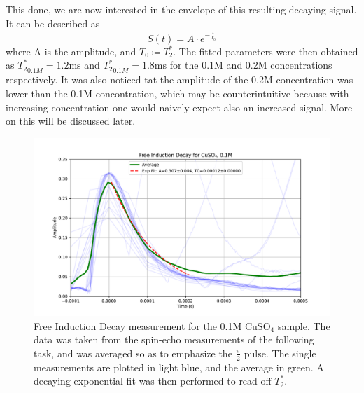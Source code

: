 \documentclass[12pt]{article}
\begin{document}
This done, we are now interested in the envelope of this resulting decaying signal. It can be described as  \[
	S(t) = A \cdot e^{-\frac{t}{T_0}}
\]
where A is the amplitude, and $T_0 \coloneq T_2^*$. The fitted parameters were then obtained as ${T_2^*}_{0.1M} = 1.2 \text{ms}$ and ${T_2^*}_{0.1M} = 1.8 \text{ms}$ for the 0.1M and 0.2M concentrations respectively. It was also noticed tat the amplitude of the 0.2M concentration was lower than the 0.1M concontration, which may be counterintuitive because with increasing concentration one would naively expect also an increased signal. More on this will be discussed later.

\begin{figure}[H]
  \includegraphics[scale = 0.5]{Free_Induction_Decay_0.1M.pdf}
  \caption{Free Induction Decay measurement for the 0.1M $\text{CuSO}_4$ sample. The data was taken from the spin-echo measurements of the following task, and was averaged so as to emphasize the $\frac{\pi}{2}$ pulse. The single measurements are plotted in light blue, and the average in green. A decaying exponential fit was then performed to read off $T_2^*$.}
  \label{Free_Induction_Decay_0.1M.pdf}
\end{figure}
\end{document}

